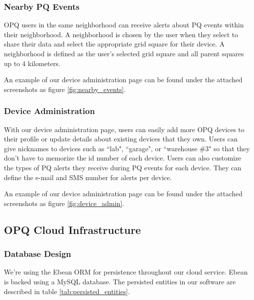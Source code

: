 \documentclass[11pt]{article}
\begin{document}
\subsubsection{Nearby PQ Events}
OPQ users in the same neighborhood can receive alerts about PQ events within their neighborhood. A neighborhood is chosen by the user when they select to share their data and select the appropriate grid square for their device. A neighborhood is defined as the user's selected grid square and all parent squares up to 4 kilometers. 

An example of our device administration page can be found under the attached screenshots as figure \ref{fig:nearby_events}.

\subsubsection{Device Administration}
With our device administration page, users can easily add more OPQ devices to their profile or update details about existing devices that they own. Users can give nicknames to devices such as ``lab", ``garage", or ``warehouse \#3" so that they don't have to memorize the id number of each device. Users can also customize the types of PQ alerts they receive during PQ events for each device. They can define the e-mail and SMS number for alerts per device.

An example of our device administration page can be found under the attached screenshots as figure \ref{fig:device_admin}.

\subsection{OPQ Cloud Infrastructure}
\subsubsection{Database Design}
We're using the Ebean ORM for persistence throughout our cloud service. Ebean is backed using a MySQL database. The persisted entities in our software are described in table \ref{tab:persisted_entities}.
\end{document}
